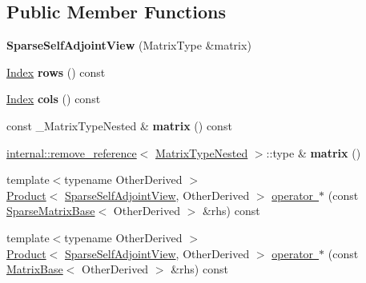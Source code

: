 \subsection*{Public Member Functions}
\begin{DoxyCompactItemize}
\item 
\mbox{\label{class_eigen_1_1_sparse_self_adjoint_view_aca0a4560bb307e085dd0a64efc89297e}} 
{\bfseries Sparse\+Self\+Adjoint\+View} (Matrix\+Type \&matrix)
\item 
\mbox{\label{class_eigen_1_1_sparse_self_adjoint_view_ac752c3b95b110340d0eff3ddda976984}} 
\mbox{\hyperlink{struct_eigen_1_1_eigen_base_a554f30542cc2316add4b1ea0a492ff02}{Index}} {\bfseries rows} () const
\item 
\mbox{\label{class_eigen_1_1_sparse_self_adjoint_view_ae3091054ec7ebbbb5547e71096d158fd}} 
\mbox{\hyperlink{struct_eigen_1_1_eigen_base_a554f30542cc2316add4b1ea0a492ff02}{Index}} {\bfseries cols} () const
\item 
\mbox{\label{class_eigen_1_1_sparse_self_adjoint_view_aae5005166b1bc1a4a35642b0c243a533}} 
const \+\_\+\+Matrix\+Type\+Nested \& {\bfseries matrix} () const
\item 
\mbox{\label{class_eigen_1_1_sparse_self_adjoint_view_a5ed74e7721726e8ba644ce95d3e06df7}} 
\mbox{\hyperlink{struct_eigen_1_1internal_1_1remove__reference}{internal\+::remove\+\_\+reference}}$<$ \mbox{\hyperlink{struct_eigen_1_1internal_1_1true__type}{Matrix\+Type\+Nested}} $>$\+::type \& {\bfseries matrix} ()
\item 
{\footnotesize template$<$typename Other\+Derived $>$ }\\\mbox{\hyperlink{class_eigen_1_1_product}{Product}}$<$ \mbox{\hyperlink{class_eigen_1_1_sparse_self_adjoint_view}{Sparse\+Self\+Adjoint\+View}}, Other\+Derived $>$ \mbox{\hyperlink{class_eigen_1_1_sparse_self_adjoint_view_a7faf4a36a9275b9ed9bd0efe930f5523}{operator $\ast$}} (const \mbox{\hyperlink{class_eigen_1_1_sparse_matrix_base}{Sparse\+Matrix\+Base}}$<$ Other\+Derived $>$ \&rhs) const
\item 
{\footnotesize template$<$typename Other\+Derived $>$ }\\\mbox{\hyperlink{class_eigen_1_1_product}{Product}}$<$ \mbox{\hyperlink{class_eigen_1_1_sparse_self_adjoint_view}{Sparse\+Self\+Adjoint\+View}}, Other\+Derived $>$ \mbox{\hyperlink{class_eigen_1_1_sparse_self_adjoint_view_ab1fca90b37ab93a0d417d29e7490b238}{operator $\ast$}} (const \mbox{\hyperlink{class_eigen_1_1_matrix_base}{Matrix\+Base}}$<$ Other\+Derived $>$ \&rhs) const

\end{DoxyCompactItemize}
